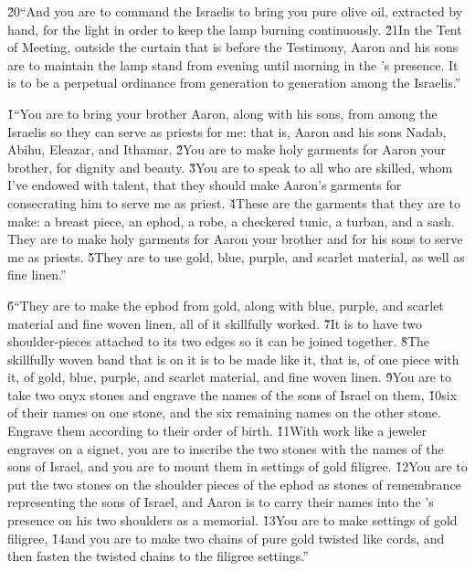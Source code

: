 \v{20}``And you are to command the Israelis to bring you pure olive oil, extracted by hand, for the light in order to keep the lamp burning continuously. \v{21}In the Tent of Meeting, outside the curtain that is before the Testimony, Aaron and his sons are to maintain the lamp stand from evening until morning in the 's presence. It is to be a perpetual ordinance from generation to generation among the Israelis.''

\v{1}``You are to bring your brother Aaron, along with his sons, from among the Israelis so they can serve as priests for me: that is, Aaron and his sons Nadab, Abihu, Eleazar, and Ithamar. \v{2}You are to make holy garments for Aaron your brother, for dignity and beauty. \v{3}You are to speak to all who are skilled, whom I've endowed with talent, that they should make Aaron's garments for consecrating him to serve me as priest. \v{4}These are the garments that they are to make: a breast piece, an ephod, a robe, a checkered tunic, a turban, and a sash. They are to make holy garments for Aaron your brother and for his sons to serve me as priests. \v{5}They are to use gold, blue, purple, and scarlet material, as well as fine linen.''

\v{6}``They are to make the ephod from gold, along with blue, purple, and scarlet material and fine woven linen, all of it skillfully worked. \v{7}It is to have two shoulder-pieces attached to its two edges so it can be joined together. \v{8}The skillfully woven band that is on it is to be made like it, that is, of one piece with it, of gold, blue, purple, and scarlet material, and fine woven linen. \v{9}You are to take two onyx stones and engrave the names of the sons of Israel on them, \v{10}six of their names on one stone, and the six remaining names on the other stone. Engrave them according to their order of birth. \v{11}With work like a jeweler engraves on a signet, you are to inscribe the two stones with the names of the sons of Israel, and you are to mount them in settings of gold filigree. \v{12}You are to put the two stones on the shoulder pieces of the ephod as stones of remembrance representing the sons of Israel, and Aaron is to carry their names into the 's presence on his two shoulders as a memorial. \v{13}You are to make settings of gold filigree, \v{14}and you are to make two chains of pure gold twisted like cords, and then fasten the twisted chains to the filigree settings.''

